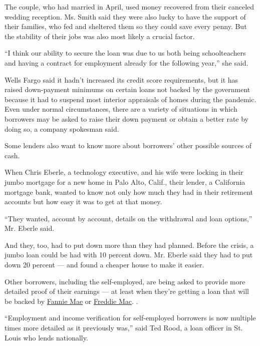 The couple, who had married in April, used money recovered from their
canceled wedding reception. Ms. Smith said they were also lucky to have
the support of their families, who fed and sheltered them so they could
save every penny. But the stability of their jobs was also most likely a
crucial factor.

``I think our ability to secure the loan was due to us both being
schoolteachers and having a contract for employment already for the
following year,'' she said.

Wells Fargo said it hadn't increased its credit score requirements, but
it has raised down-payment minimums on certain loans not backed by the
government because it had to suspend most interior appraisals of homes
during the pandemic. Even under normal circumstances, there are a
variety of situations in which borrowers may be asked to raise their
down payment or obtain a better rate by doing so, a company spokesman
said.

Some lenders also want to know more about borrowers' other possible
sources of cash.

When Chris Eberle, a technology executive, and his wife were locking in
their jumbo mortgage for a new home in Palo Alto, Calif., their lender,
a California mortgage bank, wanted to know not only how much they had in
their retirement accounts but how easy it was to get at that money.

``They wanted, account by account, details on the withdrawal and loan
options,'' Mr. Eberle said.

And they, too, had to put down more than they had planned. Before the
crisis, a jumbo loan could be had with 10 percent down. Mr. Eberle said
they had to put down 20 percent --- and found a cheaper house to make it
easier.

Other borrowers, including the self-employed, are being asked to provide
more detailed proof of their earnings --- at least when they're getting
a loan that will be backed by
\href{https://singlefamily.fanniemae.com/media/22316/display?_ga=2.27818620.1955261175.1593457830-553926868.1583167746\&_gac=1.52708252.1591220517.EAIaIQobChMIyYH3gc7m6QIVlovICh2LUgv0EAMYASAAEgJkPvD_BwE}{Fannie
Mae} or
\href{https://guide.freddiemac.com/app/guide/bulletin/2020-19}{Freddie
Mac}. .

``Employment and income verification for self-employed borrowers is now
multiple times more detailed as it previously was,'' said Ted Rood, a
loan officer in St. Louis who lends nationally.

